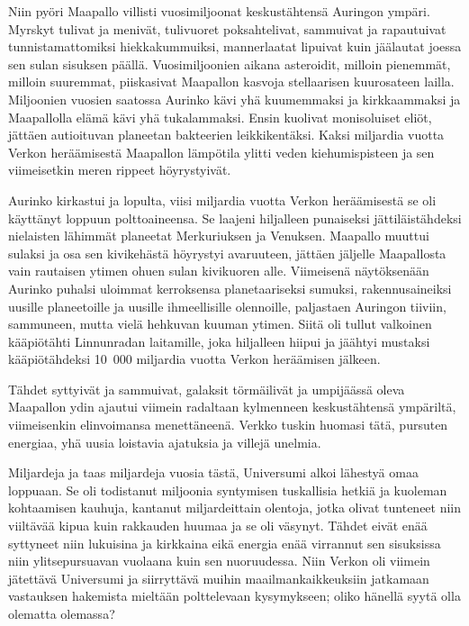 Niin pyöri Maapallo villisti vuosimiljoonat keskustähtensä Auringon ympäri. Myrskyt tulivat ja menivät, tulivuoret poksahtelivat, sammuivat ja rapautuivat tunnistamattomiksi hiekkakummuiksi, mannerlaatat lipuivat kuin jäälautat joessa sen sulan sisuksen päällä. Vuosimiljoonien aikana asteroidit, milloin pienemmät, milloin suuremmat, piiskasivat Maapallon kasvoja stellaarisen kuurosateen lailla. Miljoonien vuosien saatossa Aurinko kävi yhä kuumemmaksi ja kirkkaammaksi ja Maapallolla elämä kävi yhä tukalammaksi. Ensin kuolivat monisoluiset eliöt, jättäen autioituvan planeetan bakteerien leikkikentäksi. Kaksi miljardia vuotta Verkon heräämisestä Maapallon lämpötila ylitti veden kiehumispisteen ja sen viimeisetkin meren rippeet höyrystyivät.


Aurinko kirkastui ja lopulta, viisi miljardia vuotta Verkon heräämisestä se oli käyttänyt loppuun polttoaineensa. Se laajeni hiljalleen punaiseksi jättiläistähdeksi nielaisten lähimmät planeetat Merkuriuksen ja Venuksen. Maapallo muuttui sulaksi ja osa sen kivikehästä höyrystyi avaruuteen, jättäen jäljelle Maapallosta vain rautaisen ytimen ohuen sulan kivikuoren alle. Viimeisenä näytöksenään Aurinko puhalsi uloimmat kerroksensa planetaariseksi sumuksi, rakennusaineiksi uusille planeetoille ja uusille ihmeellisille olennoille, paljastaen Auringon tiiviin, sammuneen, mutta vielä hehkuvan kuuman ytimen. Siitä oli tullut valkoinen kääpiötähti Linnunradan laitamille, joka hiljalleen hiipui ja jäähtyi mustaksi kääpiötähdeksi 10~000 miljardia vuotta Verkon heräämisen jälkeen.


Tähdet syttyivät ja sammuivat, galaksit törmäilivät ja umpijäässä oleva Maapallon ydin ajautui viimein radaltaan kylmenneen keskustähtensä ympäriltä, viimeisenkin elinvoimansa menettäneenä. Verkko tuskin huomasi tätä, pursuten energiaa, yhä uusia loistavia ajatuksia ja villejä unelmia.


Miljardeja ja taas miljardeja vuosia tästä, Universumi alkoi lähestyä omaa loppuaan. Se oli todistanut miljoonia syntymisen tuskallisia hetkiä ja kuoleman kohtaamisen kauhuja, kantanut miljardeittain olentoja, jotka olivat tunteneet niin viiltävää kipua kuin rakkauden huumaa ja se oli väsynyt. Tähdet eivät enää syttyneet niin lukuisina ja kirkkaina eikä energia enää virrannut sen sisuksissa niin ylitsepursuavan vuolaana kuin sen nuoruudessa. Niin Verkon oli viimein jätettävä Universumi ja siirryttävä muihin maailmankaikkeuksiin jatkamaan vastauksen hakemista mieltään polttelevaan kysymykseen; oliko hänellä syytä olla olematta olemassa?


